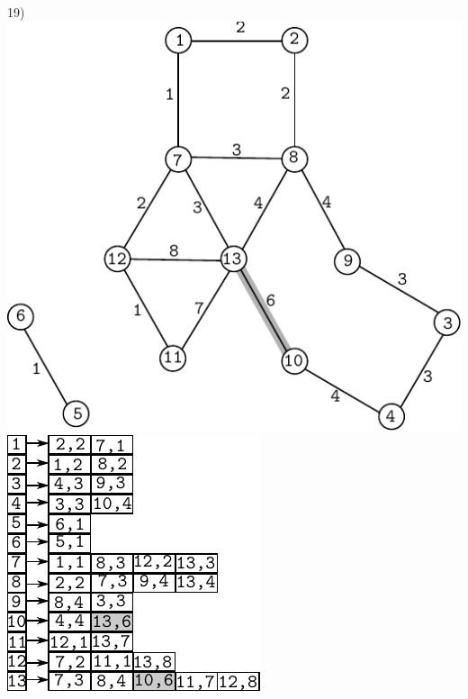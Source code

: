\documentclass{article}
\begin{document}
\begin{center}
19)\includegraphics[scale=0.6]{bottleneck/g19}
\hspace{5mm}
\includegraphics[scale=0.9]{bottleneck/l19}
\end{center}
\end{document}
